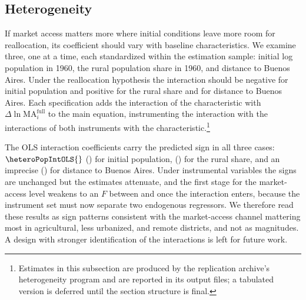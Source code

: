 \subsection{Heterogeneity}
\label{sec:heterogeneity}


If market access matters more where initial conditions leave more
room for reallocation, its coefficient should vary with baseline
characteristics. We examine three, one at a time, each standardized
within the estimation sample: initial log population in 1960, the
rural population share in 1960, and distance to Buenos Aires. Under
the reallocation hypothesis the interaction should be negative for
initial population and positive for the rural share and for distance
to Buenos Aires. Each specification adds the interaction of the
characteristic with $\Delta \ln \mathrm{MA}^{\mathrm{full}}_i$ to the
main equation, instrumenting the interaction with the interactions of
both instruments with the characteristic.\footnote{Estimates in this
subsection are produced by the replication archive's heterogeneity
program and are reported in its output files; a tabulated version is
deferred until the section structure is final.}

The OLS interaction coefficients carry the predicted sign in all
three cases: $\heteroPopIntOLS{}$ (\heteroPopIntSEOLS{}) for initial
population, \heteroRurIntOLS{} (\heteroRurIntSEOLS{}) for the rural
share, and an imprecise \heteroDistIntOLS{} (\heteroDistIntSEOLS{})
for distance to Buenos Aires. Under instrumental variables the signs are
unchanged but the estimates attenuate, and the first stage for the
market-access level weakens to an $F$ between \heteroFMaMin{} and
\heteroFMaMax{} once the interaction enters, because the instrument
set must now separate two endogenous regressors. We therefore read these results as sign patterns
consistent with the market-access channel mattering most in
agricultural, less urbanized, and remote districts, and not as
magnitudes. A design with stronger identification of the interactions
is left for future work.
